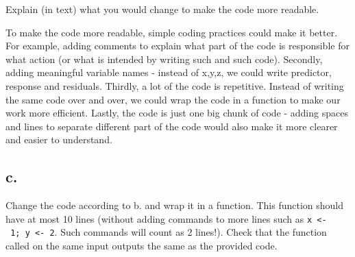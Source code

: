 \documentclass[
]{article}
\begin{document}
Explain (in text) what you would change to make the code more readable.

To make the code more readable, simple coding practices could make it
better. For example, adding comments to explain what part of the code is
responsible for what action (or what is intended by writing such and
such code). Secondly, adding meaningful variable names - instead of
x,y,z, we could write predictor, response and residuals. Thirdly, a lot
of the code is repetitive. Instead of writing the same code over and
over, we could wrap the code in a function to make our work more
efficient. Lastly, the code is just one big chunk of code - adding
spaces and lines to separate different part of the code would also make
it more clearer and easier to understand.

\subsection{c.}\label{c.-4}

Change the code according to b. and wrap it in a function. This function
should have at most 10 lines (without adding commands to more lines such
as \texttt{x\ \textless{}-\ 1;\ y\ \textless{}-\ 2}. Such commands will
count as 2 lines!). Check that the function called on the same input
outputs the same as the provided code.
\end{document}
